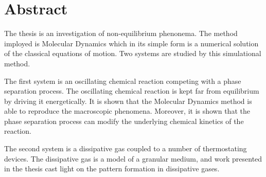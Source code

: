 
\chapter*{Abstract}

The thesis is an investigation of non-equilibrium phenonema. The method
imployed is Molecular Dynamics which in its simple form is a numerical
solution of the classical equations of motion. Two systems are studied
by this simulational method.

The first system is an oscillating chemical reaction competing with a
phase separation process. The oscillating chemical reaction is kept far
from equilibrium by driving it energetically. It is shown that the
Molecular Dynamics method is able to reproduce the macroscopic
phenomena. Moreover, it is shown that the phase separation process
can modify the underlying chemical kinetics of the reaction.

The second system is a dissipative gas coupled to a number of
thermostating devices. The dissipative gas is a model of a granular
medium, and work presented in the thesis cast light on the pattern
formation in dissipative gases.
